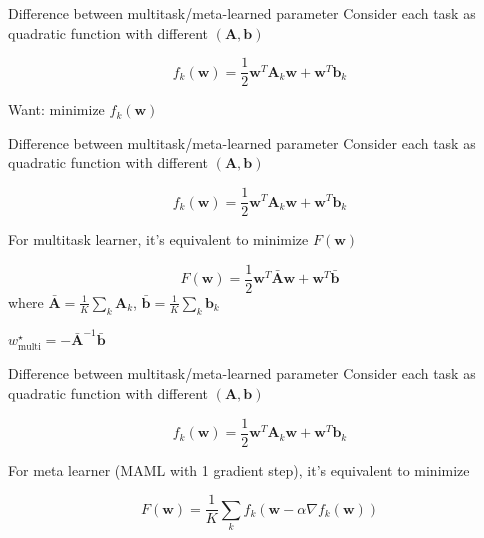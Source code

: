 \documentclass{beamer}
\begin{document}
\begin{frame}[t]{Difference between multitask/meta-learned parameter}
  Consider each task as quadratic function with different $(\mathbf{A}, \mathbf{b})$

  \begin{equation*}
    f_k(\mathbf{w}) = \frac{1}{2} \mathbf{w}^T \mathbf{A}_k \mathbf{w} + \mathbf{w}^T \mathbf{b}_k
  \end{equation*}

  Want: minimize $f_k(\mathbf{w})$
\end{frame}

\begin{frame}[t]{Difference between multitask/meta-learned parameter}
  Consider each task as quadratic function with different $(\mathbf{A}, \mathbf{b})$

  \begin{equation*}
    f_k(\mathbf{w}) = \frac{1}{2} \mathbf{w}^T \mathbf{A}_k \mathbf{w} + \mathbf{w}^T \mathbf{b}_k
  \end{equation*}

  For multitask learner, it's equivalent to minimize $F(\mathbf{w})$

  \begin{equation*}
    F(\mathbf{w}) =  \frac{1}{2} \mathbf{w}^T \bar{\mathbf{A}} \mathbf{w} + \mathbf{w}^T \bar{\mathbf{b}}
  \end{equation*}
  where $\bar{\mathbf{A}} = \frac{1}{K}\sum_k \mathbf{A}_k$, $\bar{\mathbf{b}} = \frac{1}{K}\sum_k \mathbf{b}_k$

  \center $\boxed{w^\star_{\text{multi}} = - \bar{\mathbf{A}}^{-1}\bar{\mathbf{b}}}$
\end{frame}

\begin{frame}[t]{Difference between multitask/meta-learned parameter}
  Consider each task as quadratic function with different $(\mathbf{A}, \mathbf{b})$

  \begin{equation*}
    f_k(\mathbf{w}) = \frac{1}{2} \mathbf{w}^T \mathbf{A}_k \mathbf{w} + \mathbf{w}^T \mathbf{b}_k
  \end{equation*}

  For meta learner (MAML with 1 gradient step), it's equivalent to minimize

  \begin{equation*}
    F(\mathbf{w}) =  \frac{1}{K} \sum_k f_k(\mathbf{w} - \alpha \nabla f_k(\mathbf{w})) 
  \end{equation*}
\end{frame}
\end{document}
